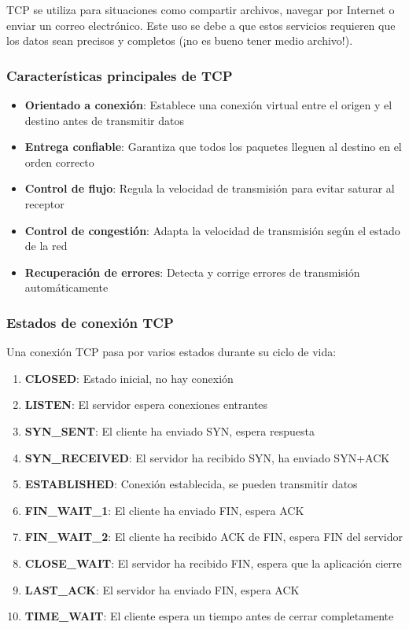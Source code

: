 TCP se utiliza para situaciones como compartir archivos, navegar por Internet o enviar un correo electrónico. Este uso se debe a que estos servicios requieren que los datos sean precisos y completos (¡no es bueno tener medio archivo!).

\subsubsection{Características principales de TCP}

\begin{itemize}
    \item \textbf{Orientado a conexión}: Establece una conexión virtual entre el origen y el destino antes de transmitir datos
    \item \textbf{Entrega confiable}: Garantiza que todos los paquetes lleguen al destino en el orden correcto
    \item \textbf{Control de flujo}: Regula la velocidad de transmisión para evitar saturar al receptor
    \item \textbf{Control de congestión}: Adapta la velocidad de transmisión según el estado de la red
    \item \textbf{Recuperación de errores}: Detecta y corrige errores de transmisión automáticamente
\end{itemize}

\subsubsection{Estados de conexión TCP}

Una conexión TCP pasa por varios estados durante su ciclo de vida:

\begin{enumerate}
    \item \textbf{CLOSED}: Estado inicial, no hay conexión
    \item \textbf{LISTEN}: El servidor espera conexiones entrantes
    \item \textbf{SYN\_SENT}: El cliente ha enviado SYN, espera respuesta
    \item \textbf{SYN\_RECEIVED}: El servidor ha recibido SYN, ha enviado SYN+ACK
    \item \textbf{ESTABLISHED}: Conexión establecida, se pueden transmitir datos
    \item \textbf{FIN\_WAIT\_1}: El cliente ha enviado FIN, espera ACK
    \item \textbf{FIN\_WAIT\_2}: El cliente ha recibido ACK de FIN, espera FIN del servidor
    \item \textbf{CLOSE\_WAIT}: El servidor ha recibido FIN, espera que la aplicación cierre
    \item \textbf{LAST\_ACK}: El servidor ha enviado FIN, espera ACK
    \item \textbf{TIME\_WAIT}: El cliente espera un tiempo antes de cerrar completamente
\end{enumerate}




